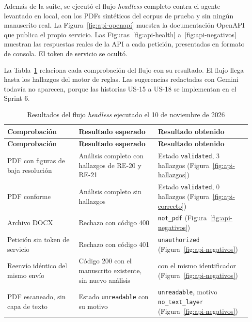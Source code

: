 Además de la suite, se ejecutó el flujo \emph{headless} completo contra el agente levantado en local, con los PDFs sintéticos del corpus de prueba y sin ningún manuscrito real. La Figura~\ref{fig:api-openapi} muestra la documentación OpenAPI que publica el propio servicio. Las Figuras~\ref{fig:api-health} a~\ref{fig:api-negativos} muestran las respuestas reales de la API a cada petición, presentadas en formato de consola. El token de servicio se ocultó.


La Tabla~\ref{tab:3-18} relaciona cada comprobación del flujo con su resultado. El flujo llega hasta los hallazgos del motor de reglas. Las sugerencias redactadas con Gemini todavía no aparecen, porque las historias US-15 a US-18 se implementan en el Sprint 6.

{\small
\begin{longtable}{@{}>{\raggedright\arraybackslash}p{}>{\raggedright\arraybackslash}p{}>{\raggedright\arraybackslash}p{}@{}}
\caption{Resultados del flujo \emph{headless} ejecutado el 10 de noviembre de 2026}\label{tab:3-18}\\
\toprule
\textbf{Comprobación} & \textbf{Resultado esperado} & \textbf{Resultado obtenido} \\
\midrule
\endfirsthead
\toprule
\textbf{Comprobación} & \textbf{Resultado esperado} & \textbf{Resultado obtenido} \\
\midrule
\endhead
\bottomrule
\endfoot
\endlastfoot
PDF con figuras de baja resolución & Análisis completo con hallazgos de RE-20 y RE-21 & Estado \texttt{validated}, 3 hallazgos (Figura~\ref{fig:api-hallazgos}) \\
PDF conforme & Análisis completo sin hallazgos & Estado \texttt{validated}, 0 hallazgos (Figura~\ref{fig:api-correcto}) \\
Archivo DOCX & Rechazo con código 400 & 400 \texttt{not\_pdf} (Figura~\ref{fig:api-negativos}) \\
Petición sin token de servicio & Rechazo con código 401 & 401 \texttt{unauthorized} (Figura~\ref{fig:api-negativos}) \\
Reenvío idéntico del mismo envío & Código 200 con el manuscrito existente, sin nuevo análisis & 200 con el mismo identificador (Figura~\ref{fig:api-negativos}) \\
PDF escaneado, sin capa de texto & Estado \texttt{unreadable} con su motivo & \texttt{unreadable}, motivo \texttt{no\_text\_layer} (Figura~\ref{fig:api-negativos}) \\
\end{longtable}
}

